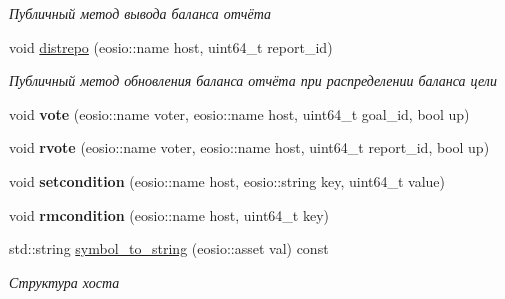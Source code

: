 \begin{DoxyCompactItemize}
$$\begin{DoxyCompactList}\small\item\em Публичный метод вывода баланса отчёта \end{DoxyCompactList}\item 
void \mbox{\hyperlink{classunicore_ae82cde0f788172b152c6b6896ac75d0d}{distrepo}} (eosio\+::name host, uint64\+\_\+t report\+\_\+id)
\begin{DoxyCompactList}\small\item\em Публичный метод обновления баланса отчёта при распределении баланса цели \end{DoxyCompactList}\item 
\mbox{\label{classunicore_ac1ca3033e5f65695c938c3d0621e6bfb}} 
void {\bfseries vote} (eosio\+::name voter, eosio\+::name host, uint64\+\_\+t goal\+\_\+id, bool up)
\item 
\mbox{\label{classunicore_ace8526f2178dd5662a3d96fa1b9b6c7f}} 
void {\bfseries rvote} (eosio\+::name voter, eosio\+::name host, uint64\+\_\+t report\+\_\+id, bool up)
\item 
\mbox{\label{classunicore_a7b973d2c279fca2fa0cc08c35ebf1abe}} 
void {\bfseries setcondition} (eosio\+::name host, eosio\+::string key, uint64\+\_\+t value)
\item 
\mbox{\label{classunicore_a624a721f564fd28c295bdeef482bacc8}} 
void {\bfseries rmcondition} (eosio\+::name host, uint64\+\_\+t key)
\item 
std\+::string \mbox{\hyperlink{classunicore_adb0134644edf42ff41b84bca15e6e8ff}{symbol\+\_\+to\+\_\+string}} (eosio\+::asset val) const
\begin{DoxyCompactList}\small\item\em Структура хоста \end{DoxyCompactList}\end{DoxyCompactItemize}
